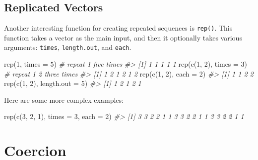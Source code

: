 \documentclass[
]{book}
\newenvironment{Shaded}{\begin{snugshade}}{\end{snugshade}}
\newcommand{\AttributeTok}[1]{\textcolor[rgb]{0.77,0.63,0.00}{#1}}
\newcommand{\CommentTok}[1]{\textcolor[rgb]{0.56,0.35,0.01}{\textit{#1}}}
\newcommand{\DecValTok}[1]{\textcolor[rgb]{0.00,0.00,0.81}{#1}}
\newcommand{\FunctionTok}[1]{\textcolor[rgb]{0.00,0.00,0.00}{#1}}
\newcommand{\NormalTok}[1]{#1}
\begin{document}
\hypertarget{replicated-vectors}{%
\subsection{Replicated Vectors}\label{replicated-vectors}}

Another interesting function for creating repeated sequences is \texttt{rep()}. This
function takes a vector as the main input, and then it
optionally takes various arguments: \texttt{times}, \texttt{length.out}, and \texttt{each}.

\begin{Shaded}
\begin{Highlighting}[]
\FunctionTok{rep}\NormalTok{(}\DecValTok{1}\NormalTok{, }\AttributeTok{times =} \DecValTok{5}\NormalTok{)        }\CommentTok{\# repeat 1 five times}
\CommentTok{\#\textgreater{} [1] 1 1 1 1 1}
\FunctionTok{rep}\NormalTok{(}\FunctionTok{c}\NormalTok{(}\DecValTok{1}\NormalTok{, }\DecValTok{2}\NormalTok{), }\AttributeTok{times =} \DecValTok{3}\NormalTok{)  }\CommentTok{\# repeat 1 2 three times}
\CommentTok{\#\textgreater{} [1] 1 2 1 2 1 2}
\FunctionTok{rep}\NormalTok{(}\FunctionTok{c}\NormalTok{(}\DecValTok{1}\NormalTok{, }\DecValTok{2}\NormalTok{), }\AttributeTok{each =} \DecValTok{2}\NormalTok{)}
\CommentTok{\#\textgreater{} [1] 1 1 2 2}
\FunctionTok{rep}\NormalTok{(}\FunctionTok{c}\NormalTok{(}\DecValTok{1}\NormalTok{, }\DecValTok{2}\NormalTok{), }\AttributeTok{length.out =} \DecValTok{5}\NormalTok{)}
\CommentTok{\#\textgreater{} [1] 1 2 1 2 1}
\end{Highlighting}
\end{Shaded}

Here are some more complex examples:

\begin{Shaded}
\begin{Highlighting}[]
\FunctionTok{rep}\NormalTok{(}\FunctionTok{c}\NormalTok{(}\DecValTok{3}\NormalTok{, }\DecValTok{2}\NormalTok{, }\DecValTok{1}\NormalTok{), }\AttributeTok{times =} \DecValTok{3}\NormalTok{, }\AttributeTok{each =} \DecValTok{2}\NormalTok{)}
\CommentTok{\#\textgreater{}  [1] 3 3 2 2 1 1 3 3 2 2 1 1 3 3 2 2 1 1}
\end{Highlighting}
\end{Shaded}

\hypertarget{coercion}{%
\section{Coercion}\label{coercion}}
\end{document}
